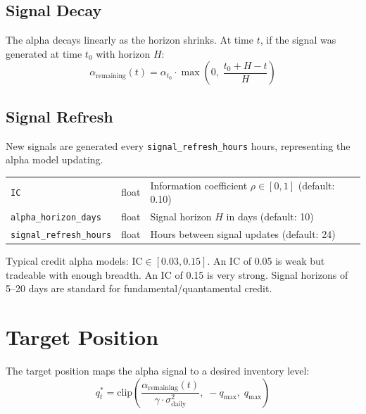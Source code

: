 \documentclass[11pt,a4paper]{article}
\begin{document}
\subsection{Signal Decay}

The alpha decays linearly as the horizon shrinks. At time $t$, if the signal was generated at time $t_0$ with horizon $H$:
\begin{equation}
\alpha_{\text{remaining}}(t) = \alpha_{t_0} \cdot \max\!\left(0,\; \frac{t_0 + H - t}{H}\right)
\end{equation}

\subsection{Signal Refresh}

New signals are generated every \texttt{signal\_refresh\_hours} hours, representing the alpha model updating.

\begin{parambox}[Knobs]
\begin{tabular}{@{}lll@{}}
\texttt{IC} & float & Information coefficient $\rho \in [0, 1]$ (default: 0.10) \\
\texttt{alpha\_horizon\_days} & float & Signal horizon $H$ in days (default: 10) \\
\texttt{signal\_refresh\_hours} & float & Hours between signal updates (default: 24) \\
\end{tabular}
\end{parambox}

\begin{specbox}
Typical credit alpha models: $\text{IC} \in [0.03, 0.15]$. An IC of 0.05 is weak but tradeable with enough breadth. An IC of 0.15 is very strong. Signal horizons of 5--20 days are standard for fundamental/quantamental credit.
\end{specbox}


\section{Target Position}\label{sec:target}

The target position maps the alpha signal to a desired inventory level:
\begin{equation}
q^*_t = \text{clip}\!\left(\frac{\alpha_{\text{remaining}}(t)}{\gamma \cdot \sigma^2_{\text{daily}}},\; -q_{\max},\; q_{\max}\right)
\end{equation}
\end{document}
